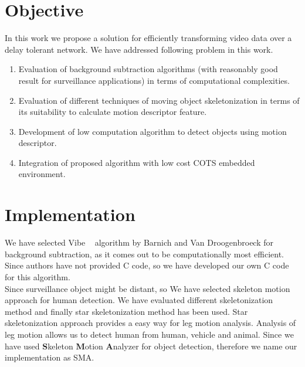 \documentclass[a4paper, 12pt, twoside]{synopsis}  %
\begin{document}
\section{Objective}
\indent	In this work we propose a solution for efficiently transforming
video data   over   a delay   tolerant   network.  We have addressed
following problem in this work.\\
\begin{enumerate}
\item Evaluation of background subtraction algorithms (with reasonably
good result for surveillance applications) in terms of computational
complexities. 
\item Evaluation of different techniques of moving object
skeletonization in terms of its suitability to calculate motion
descriptor feature. 
\item Development of low computation algorithm to detect objects using
motion descriptor.
\item Integration of proposed algorithm with low cost COTS embedded
environment.
\end{enumerate}
\section{Implementation}
\indent We have selected Vibe ~\cite{5} algorithm by Barnich and Van
Droogenbroeck for background subtraction, as it comes out to be
computationally most efficient. Since authors have not provided C code,
so we have developed our own C code for this algorithm.\\
\indent Since surveillance object might be distant, so We have selected
skeleton motion approach for human detection. We have evaluated
different skeletonization method and finally star skeletonization method
has been used. Star skeletonization approach provides a easy way for leg
motion analysis. Analysis of leg motion allows us to detect human from
human, vehicle and animal. Since we have used \textbf{S}keleton
\textbf{M}otion \textbf{A}nalyzer for object detection, therefore we
name our implementation as SMA.\\
\end{document}
